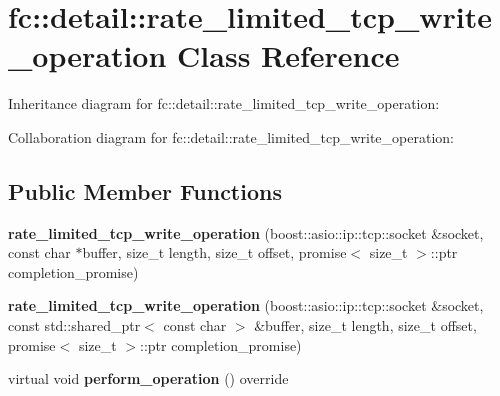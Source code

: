 \hypertarget{classfc_1_1detail_1_1rate__limited__tcp__write__operation}{}\section{fc\+:\+:detail\+:\+:rate\+\_\+limited\+\_\+tcp\+\_\+write\+\_\+operation Class Reference}
\label{classfc_1_1detail_1_1rate__limited__tcp__write__operation}


Inheritance diagram for fc\+:\+:detail\+:\+:rate\+\_\+limited\+\_\+tcp\+\_\+write\+\_\+operation\+:


Collaboration diagram for fc\+:\+:detail\+:\+:rate\+\_\+limited\+\_\+tcp\+\_\+write\+\_\+operation\+:
\subsection*{Public Member Functions}
\begin{DoxyCompactItemize}
\item 
\mbox{\label{classfc_1_1detail_1_1rate__limited__tcp__write__operation_a913c933e1221acc0a68bb41da8ca615b}} 
{\bfseries rate\+\_\+limited\+\_\+tcp\+\_\+write\+\_\+operation} (boost\+::asio\+::ip\+::tcp\+::socket \&socket, const char $\ast$buffer, size\+\_\+t length, size\+\_\+t offset, promise$<$ size\+\_\+t $>$\+::ptr completion\+\_\+promise)
\item 
\mbox{\label{classfc_1_1detail_1_1rate__limited__tcp__write__operation_a35409a17cddfb784f7665afbe1ed2494}} 
{\bfseries rate\+\_\+limited\+\_\+tcp\+\_\+write\+\_\+operation} (boost\+::asio\+::ip\+::tcp\+::socket \&socket, const std\+::shared\+\_\+ptr$<$ const char $>$ \&buffer, size\+\_\+t length, size\+\_\+t offset, promise$<$ size\+\_\+t $>$\+::ptr completion\+\_\+promise)
\item 
\mbox{\label{classfc_1_1detail_1_1rate__limited__tcp__write__operation_a333fa348b1497124ff27733ab0d5e3d8}} 
virtual void {\bfseries perform\+\_\+operation} () override
\end{DoxyCompactItemize}
